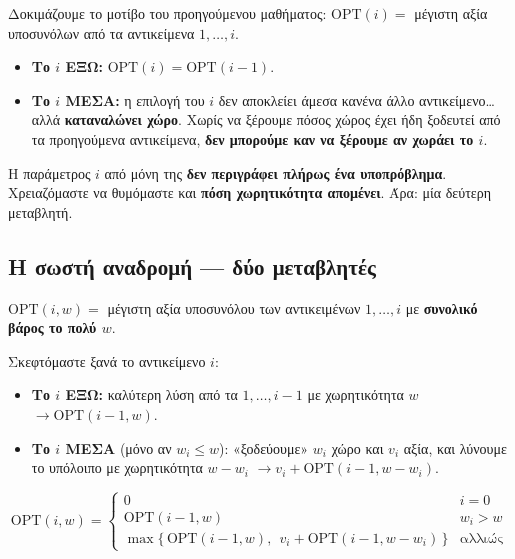 \documentclass[11pt,a4paper]{article}
\begin{document}
Δοκιμάζουμε το μοτίβο του προηγούμενου μαθήματος: $\text{OPT}(i) = $ μέγιστη αξία
υποσυνόλων από τα αντικείμενα $1, \dots, i$.
\begin{itemize}
  \item \textbf{Το $i$ ΕΞΩ:} $\text{OPT}(i) = \text{OPT}(i-1)$.
  \item \textbf{Το $i$ ΜΕΣΑ:} η επιλογή του $i$ δεν αποκλείει άμεσα κανένα άλλο
  αντικείμενο\dots αλλά \textbf{καταναλώνει χώρο}. Χωρίς να ξέρουμε πόσος χώρος
  έχει ήδη ξοδευτεί από τα προηγούμενα αντικείμενα, \textbf{δεν μπορούμε καν να
  ξέρουμε αν χωράει το $i$}.
\end{itemize}

\begin{keypoint}
Η παράμετρος $i$ από μόνη της \textbf{δεν περιγράφει πλήρως ένα υποπρόβλημα}.
Χρειαζόμαστε να θυμόμαστε και \textbf{πόση χωρητικότητα απομένει}. Άρα: μία
δεύτερη μεταβλητή.
\end{keypoint}

\subsection{Η σωστή αναδρομή --- δύο μεταβλητές}

\begin{keypoint}
$\text{OPT}(i, w) = $ μέγιστη αξία υποσυνόλου των αντικειμένων $1, \dots, i$ με
\textbf{συνολικό βάρος το πολύ $w$}.
\end{keypoint}

Σκεφτόμαστε ξανά το αντικείμενο $i$:
\begin{itemize}
  \item \textbf{Το $i$ ΕΞΩ:} καλύτερη λύση από τα $1, \dots, i-1$ με
  χωρητικότητα $w$ $\to \text{OPT}(i-1, w)$.
  \item \textbf{Το $i$ ΜΕΣΑ} (μόνο αν $w_i \le w$): «ξοδεύουμε» $w_i$ χώρο και
  $v_i$ αξία, και λύνουμε το υπόλοιπο με χωρητικότητα $w - w_i$ $\to v_i +
  \text{OPT}(i-1, w - w_i)$.
\end{itemize}

\begin{keypoint}
\[
\text{OPT}(i, w) =
\begin{cases}
0 & i = 0 \\[4pt]
\text{OPT}(i-1, w) & w_i > w \\[4pt]
\max\bigl\{\, \text{OPT}(i-1, w),\ \ v_i + \text{OPT}(i-1, w - w_i) \,\bigr\} &
\text{αλλιώς}
\end{cases}
\]
\end{keypoint}
\end{document}
